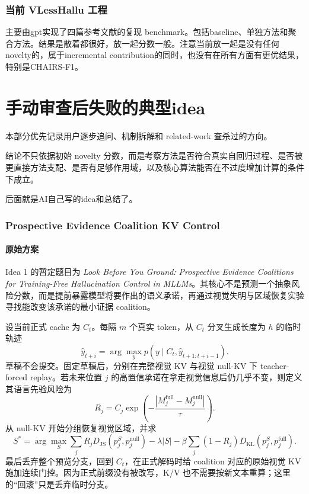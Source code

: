 \documentclass[UTF8,zihao=-4,a4paper]{ctexart}
\begin{document}
\section{当前 VLessHallu 工程}

主要由gpt实现了四篇参考文献的复现 benchmark。包括baseline、单独方法和聚合方法。结果是散着都很好，放一起分数一般。注意当前放一起是没有任何novelty的，属于incremental contribution的同时，也没有在所有方面有更优结果，特别是CHAIRS-F1。

\clearpage
\part{手动审查后失败的典型idea}

本部分优先记录用户逐步追问、机制拆解和 related-work 查杀过的方向。

结论不只依据初始 novelty 分数，而是考察方法是否符合真实自回归过程、是否被更直接方法支配、是否有足够作用域，以及核心算法能否在不过度增加计算的条件下成立。

后面就是AI自己写的idea和总结了。

\section{Prospective Evidence Coalition KV Control}
\label{sec:pec}

\subsection{原始方案}

Idea 1 的暂定题目为 \emph{Look Before You Ground: Prospective Evidence Coalitions for Training-Free Hallucination Control in MLLMs}。其核心不是预测一个抽象风险分数，而是提前暴露模型将要作出的语义承诺，再通过视觉失明与区域恢复实验寻找能改变该承诺的最小证据 coalition。

设当前正式 cache 为 $C_t$。每隔 $m$ 个真实 token，从 $C_t$ 分叉生成长度为 $h$ 的临时轨迹
\[
\hat y_{t+i}=\arg\max_y p(y\mid C_t,\hat y_{t+1:t+i-1}).
\]
草稿不会提交。固定草稿后，分别在完整视觉 KV 与视觉 null-KV 下 teacher-forced replay。若未来位置 $j$ 的高置信承诺在拿走视觉信息后仍几乎不变，则定义其语言先验风险为
\[
R_j=C_j\exp\left(-\frac{|M_j^{\mathrm{full}}-M_j^{\mathrm{null}}|}{\tau}\right).
\]
从 null-KV 开始分组恢复视觉区域，并求
\[
S^*=\arg\max_S
\sum_jR_jD_{\mathrm{JS}}(p_j^S,p_j^{\mathrm{null}})
-\lambda|S|
-\beta\sum_j(1-R_j)D_{\mathrm{KL}}(p_j^S,p_j^{\mathrm{full}}).
\]
最后丢弃整个预览分支，回到 $C_t$，在正式解码时给 coalition 对应的原始视觉 KV 施加连续门控。因为正式前缀没有被改写，K/V 也不需要按新文本重算；这里的“回滚”只是丢弃临时分支。
\end{document}

